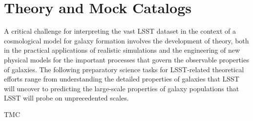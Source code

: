 \section{Theory and Mock Catalogs}\label{sec:tasks:tmc}  
{\justify
A critical challenge for interpreting the vast LSST dataset
in the context of a cosmological model for galaxy formation
involves the development of theory, both in the practical applications
of realistic simulations and the engineering of new physical
models for the important processes that govern the observable
properties of galaxies. The following preparatory science tasks 
for LSST-related theoretical efforts range from understanding the
detailed properties of galaxies that LSST will uncover to predicting
the large-scale properties of galaxy populations that LSST will probe
on unprecedented scales.


\begin{tasklist}{TMC}

\end{tasklist}}
